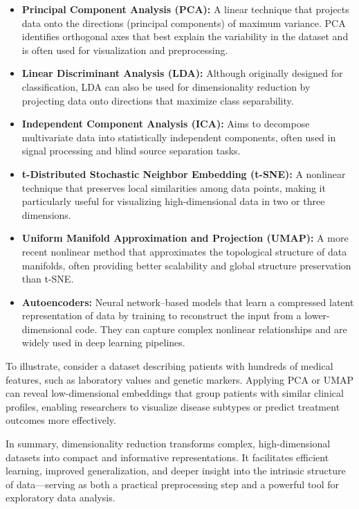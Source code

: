 \documentclass[12pt,a4paper]{report}
\begin{document}
\begin{itemize}
    \item \textbf{Principal Component Analysis (PCA):} A linear technique that projects data onto the directions (principal components) of maximum variance. 
    PCA identifies orthogonal axes that best explain the variability in the dataset and is often used for visualization and preprocessing.
    
    \item \textbf{Linear Discriminant Analysis (LDA):} Although originally designed for classification, LDA can also be used for dimensionality reduction by projecting data onto directions that maximize class separability.
    
    \item \textbf{Independent Component Analysis (ICA):} Aims to decompose multivariate data into statistically independent components, often used in signal processing and blind source separation tasks.
    
    \item \textbf{t-Distributed Stochastic Neighbor Embedding (t-SNE):} A nonlinear technique that preserves local similarities among data points, making it particularly useful for visualizing high-dimensional data in two or three dimensions.
    
    \item \textbf{Uniform Manifold Approximation and Projection (UMAP):} A more recent nonlinear method that approximates the topological structure of data manifolds, often providing better scalability and global structure preservation than t-SNE.
    
    \item \textbf{Autoencoders:} Neural network–based models that learn a compressed latent representation of data by training to reconstruct the input from a lower-dimensional code. 
    They can capture complex nonlinear relationships and are widely used in deep learning pipelines.
\end{itemize}

\vspace{0.5em}
To illustrate, consider a dataset describing patients with hundreds of medical features, such as laboratory values and genetic markers. 
Applying PCA or UMAP can reveal low-dimensional embeddings that group patients with similar clinical profiles, enabling researchers to visualize disease subtypes or predict treatment outcomes more effectively.

\vspace{0.5em}
In summary, dimensionality reduction transforms complex, high-dimensional datasets into compact and informative representations. 
It facilitates efficient learning, improved generalization, and deeper insight into the intrinsic structure of data—serving as both a practical preprocessing step and a powerful tool for exploratory data analysis.
\end{document}
